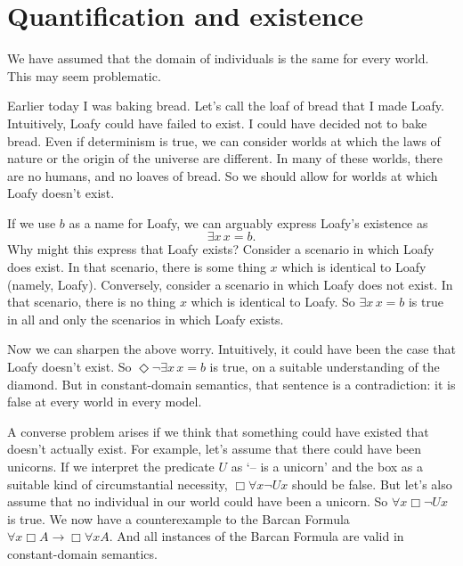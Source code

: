 
\section{Quantification and existence}

We have assumed that the domain of individuals is the same for every world. This
may seem problematic.

Earlier today I was baking bread. Let's call the loaf of bread that I made
Loafy. Intuitively, Loafy could have failed to exist. I could have decided not
to bake bread. Even if determinism is true, we can consider worlds at which the
laws of nature or the origin of the universe are different. In many of these
worlds, there are no humans, and no loaves of bread. So we should allow for
worlds at which Loafy doesn't exist.

If we use $b$ as a name for Loafy, we can arguably express Loafy's existence as
\[
  \exists x \,x\!=\!b.
\]
Why might this express that Loafy exists? Consider a scenario in which Loafy does
exist. In that scenario, there is some thing $x$ which is identical to Loafy
(namely, Loafy). Conversely, consider a scenario in which Loafy does not exist.
In that scenario, there is no thing $x$ which is identical to Loafy. So
$\exists x\, x\!=\!b$ is true in all and only the scenarios in which Loafy exists.

Now we can sharpen the above worry. Intuitively, it could have been the case
that Loafy doesn't exist. So $\Diamond \neg \exists x\, x\!=\!b$ is true, on a
suitable understanding of the diamond. But in constant-domain semantics, that
sentence is a contradiction: it is false at every world in every model.

A converse problem arises if we think that something could have existed that
doesn't actually exist. For example, let's assume that there could have been
unicorns. If we interpret the predicate $U$ as `-- is a unicorn' and the box as
a suitable kind of circumstantial necessity, $\Box \forall x \neg Ux$ should
be false. But let's also assume that no individual in our world could have
been a unicorn. So $\forall x \Box \neg Ux$ is true. We now have a
counterexample to the Barcan Formula $\forall x \Box A \to \Box \forall x A$.
And all instances of the Barcan Formula are valid in constant-domain semantics.


